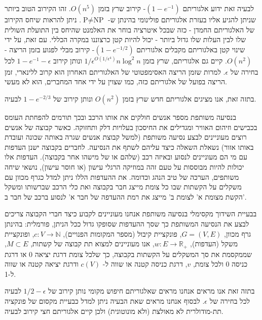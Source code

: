 \begin{hebrew}
לבעיה זאת ידוע אלגוריתם
$(1-e^{-1})$-%
קירוב שרץ בזמן
$O(n^5)$.
זהו הקירוב הטוב ביותר שניתן להגיע אליו בעזרת אלגוריתם פולינומי בהינתן ש-%
$\text{P} \neq \text{NP}$.
ניתן להראות שיחס הקירוב של האלגוריתם החמדן - כזה שבכל איטרציה בוחר את האלמנט שהיחס בין התועלת השולית שלו לבין העלות שלו גדול ביותר - יכול להיות קטן כרצוננו במקרה הכללי.
עם זאת, על ידי שינוי קטן באלגוריתם מקבלים אלגוריתם
$(1 - e^{-1/2})$-%
קירוב מבלי לפגוע בזמן הריצה -
$O(n^2)$.
קיים גם אלגוריתם, שרץ בזמן
$1/\epsilon^{O(1/\epsilon^4)}n\log^2n$
ונותן קירוב
$1 - e^{-1} -\epsilon$
לכל בחירה של
$\epsilon$.
למרות שזמן הריצה האסימפטוטי של האלגוריתם האחרון הוא קרוב ללינארי, זמן הריצה בפועל של אלגוריתם כזה, כמו שצוין על ידי אחד המחברים, הוא לא מעשי.

בתזה זאת, אנו מציגים אלגוריתם חדש שרץ בזמן
$O(n^2)$
ונותן קירוב של
$1 - e^{-2/3}$
לבעיה.




בנסיעה משותפת מספר אנשים חולקים את אותו הרכב ובכך תורמים להפחתת העומס בכבישים וזיהום האוויר ומגדילים את החיסכון בעלויות דלק ותחזוקה.
כאשר קבוצה של אנשים רוצים מעוניינים לבצע נסיעה משותפת (למשל קבוצת אנשים שגרה באותה שכונה ועובדת באותו אזור) נשאלת השאלה כיצד עליהם לשתף את הנסיעה.
לחברים בקבוצה ישנן העדפות עם מי הם מעוניינים לנסוע ובאיזה רכב (שלהם או של מישהו אחר בקבוצה).
העדפות אלו יכולות להיות מבוססות על טעם זהה במוזיקה הרגלי עישון (או חוסר עישון), נושאי שיחה משותפים, הערכה של טיב הנהג וכדומה.
את ההעדפות הללו ניתן למדל כגרף מכוון עם משקלים על הקשתות שבו כל צומת מייצג חבר בקבוצה ואת כלי הרכב שברשותו ומשקל הקשת מצומת א' לצומת ב' מייצג את רמת ההעדפה של חבר א' לנסוע ברכב של חבר ב'.

בבעיית השידוך מקסימלי בנסיעה משותפת אנחנו מעוניינים לקבוע כיצד חברי הקבוצה צריכים לבצע את הנסיעה המשותפת כך שסך ההעדפות שסופקו גדול ככל הניתן, פורמלית:
בהינתן גרף מכוון,
$G = (V, E)$,
פונקציית קיבול (מספר המקומות הפנויים),
$c:V \to \mathbb{N}$,
ופונקציית משקל (העדפות),
$w:E \to \mathbb{R}_+$,
אנו מעוניינים למצוא תת קבוצה של קשתות,
$M \subset E$,
שממקסמת את סך המשקלים על הקשתות בקבוצה, כך שלכל צומת דרגת יציאה 0 או דרגת כניסה 0 ולכל צומת,
$v$,
דרגת כניסה קטנה או שווה ל-%
$c(V)$
ודרגת יציאה קטנה או שווה ל-1.

בתזה זאת אנו מראים אנחנו מראים שאלגוריתם חיפוש מקומי נותן קירוב של
$1/2 - \epsilon$
לבעיה לכל בחירה של
$\epsilon$.
לבסוף אנחנו מראים שאת הבעיה ניתן למדל כבעיית מקסום של פונקציה תת-מודולרית לא מאולצת (ולא מונוטונית) ולכן קיים אלגוריתם חצי קירוב לבעיה.




\end{hebrew}
